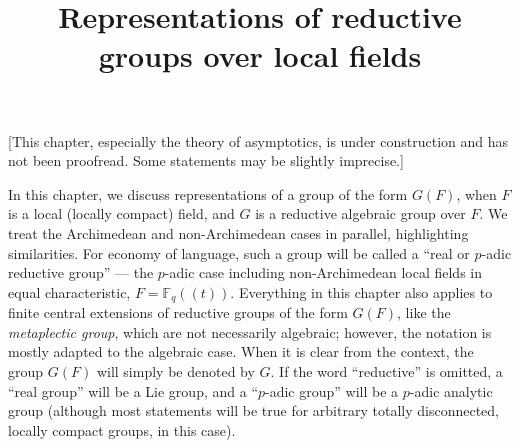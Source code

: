 

%


\title{Representations of reductive groups over local fields}


\maketitle

\label{section-phantom}


\tableofcontents

[This chapter, especially the theory of asymptotics, is under construction and has not been proofread. Some statements may be slightly imprecise.]

In this chapter, we discuss representations of a group of the form $G(F)$, when $F$ is a local (locally compact) field, and $G$ is a reductive algebraic group over $F$. We treat the Archimedean and non-Archimedean cases in parallel, highlighting similarities. For economy of language, such a group will be called a ``real or $p$-adic reductive group'' --- the $p$-adic case including non-Archimedean local fields in equal characteristic, $F=\mathbb F_q((t))$. Everything in this chapter also applies to finite central extensions of reductive groups of the form $G(F)$, like the \emph{metaplectic group}, which are not necessarily algebraic; however, the notation is mostly adapted to the algebraic case.  When it is clear from the context, the group $G(F)$ will simply be denoted by $G$. If the word ``reductive'' is omitted, a ``real group'' will be a Lie group, and a ``$p$-adic group'' will be a $p$-adic analytic group (although most statements will be true for arbitrary totally disconnected, locally compact groups, in this case).

